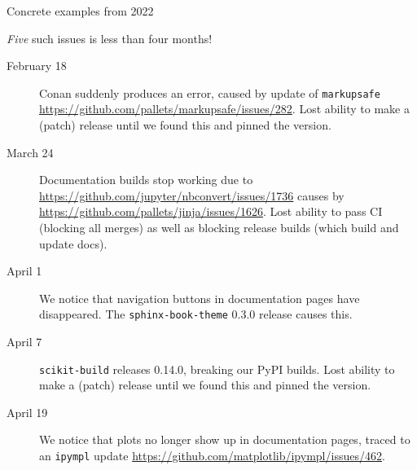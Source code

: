 \documentclass[english,aspectratio=169,smaller]{beamer}
\begin{document}
\begin{frame}[fragile]{Concrete examples from 2022}
  \begin{block}{\emph{Five} such issues is less than four months!}
    \begin{description}
      \item[February 18] Conan suddenly produces an error, caused by update of \texttt{markupsafe} \url{https://github.com/pallets/markupsafe/issues/282}.
        Lost ability to make a (patch) release until we found this and pinned the version.
      \item[March 24] Documentation builds stop working due to \url{https://github.com/jupyter/nbconvert/issues/1736} causes by \url{https://github.com/pallets/jinja/issues/1626}.
        Lost ability to pass CI (blocking all merges) as well as blocking release builds (which build and update docs).
      \item[April 1] We notice that navigation buttons in documentation pages have disappeared. The \texttt{sphinx-book-theme} 0.3.0 release causes this.
      \item[April 7] \texttt{scikit-build} releases 0.14.0, breaking our PyPI builds.
        Lost ability to make a (patch) release until we found this and pinned the version.
      \item[April 19] We notice that plots no longer show up in documentation pages, traced to an \texttt{ipympl} update \url{https://github.com/matplotlib/ipympl/issues/462}.
    \end{description}
  \end{block}
\end{frame}
\end{document}
